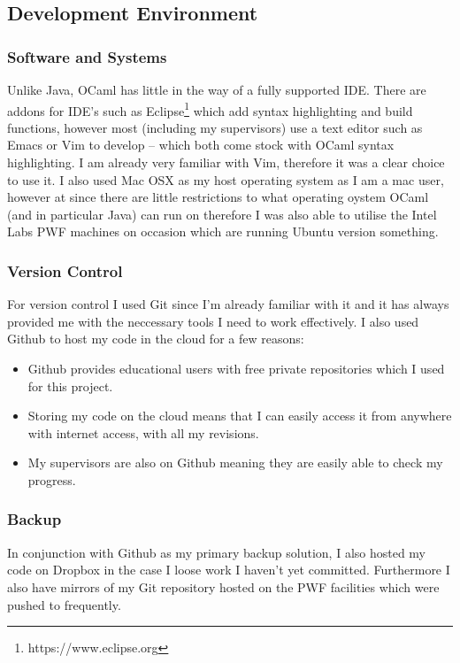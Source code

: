 \documentclass[12pt,twoside,notitlepage]{report}
\begin{document}
\subsection{Development Environment}
\label{subsec:development_environment}

\subsubsection{Software and Systems}
Unlike Java, OCaml has little in the way of a fully supported IDE. There are addons for IDE's such as Eclipse\footnote{https://www.eclipse.org} which add syntax highlighting and build functions, however most (including my supervisors)
use a text editor such as Emacs or Vim to develop -- which both come stock with OCaml syntax highlighting. I am already very familiar with Vim, therefore it was a clear choice to use it. I also used Mac OSX as my host operating system
as I am a mac user, however at since there are little restrictions to what operating oystem OCaml (and in particular Java) can run on therefore I was also able to utilise the Intel Labs PWF machines on occasion which are running
Ubuntu version something.

\subsubsection{Version Control}
For version control I used Git since I'm already familiar with it and it has always provided me with the neccessary tools I need to work effectively. I also used Github to host my code in the cloud for a few reasons:

\begin{itemize}
\item Github provides educational users with free private repositories which I used for this project.
\item Storing my code on the cloud means that I can easily access it from anywhere with internet access, with all my revisions.
\item My supervisors are also on Github meaning they are easily able to check my progress.
\end{itemize}

\subsubsection{Backup}
\label{subsubsec:backup}
In conjunction with Github as my primary backup solution, I also hosted my code on Dropbox in the case I loose work I haven't yet committed. Furthermore I also have mirrors of my Git repository hosted on the PWF facilities which were
pushed to frequently.
\end{document}
